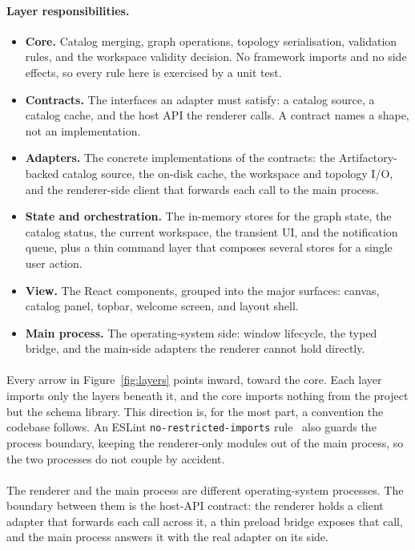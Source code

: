 \paragraph{Layer responsibilities.}
\begin{itemize}
    \item \textbf{Core.} Catalog merging, graph operations, topology serialisation, validation rules, and the workspace validity decision. No framework imports and no side effects, so every rule here is exercised by a unit test.
    \item \textbf{Contracts.} The interfaces an adapter must satisfy: a catalog source, a catalog cache, and the host API the renderer calls. A contract names a shape, not an implementation.
    \item \textbf{Adapters.} The concrete implementations of the contracts: the Artifactory-backed catalog source, the on-disk cache, the workspace and topology I/O, and the renderer-side client that forwards each call to the main process.
    \item \textbf{State and orchestration.} The in-memory stores for the graph state, the catalog status, the current workspace, the transient UI, and the notification queue, plus a thin command layer that composes several stores for a single user action.
    \item \textbf{View.} The React components, grouped into the major surfaces: canvas, catalog panel, topbar, welcome screen, and layout shell.
    \item \textbf{Main process.} The operating-system side: window lifecycle, the typed bridge, and the main-side adapters the renderer cannot hold directly.
\end{itemize}

\paragraph{}
Every arrow in Figure~\ref{fig:layers} points inward, toward the core. Each layer imports only the layers beneath it, and the core imports nothing from the project but the schema library. This direction is, for the most part, a convention the codebase follows. An ESLint \texttt{no-restricted-imports} rule~\cite{eslint} also guards the process boundary, keeping the renderer-only modules out of the main process, so the two processes do not couple by accident.

\paragraph{}
The renderer and the main process are different operating-system processes. The boundary between them is the host-API contract: the renderer holds a client adapter that forwards each call across it, a thin preload bridge exposes that call, and the main process answers it with the real adapter on its side.

